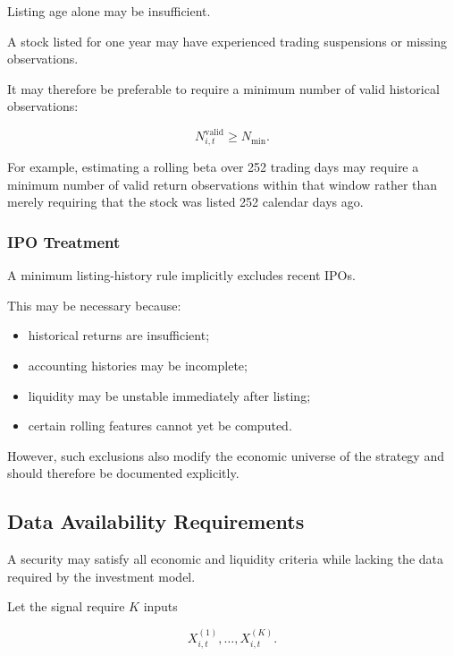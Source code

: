 \documentclass[11pt,a4paper]{article}
\begin{document}
Listing age alone may be insufficient.

A stock listed for one year may have experienced trading suspensions or missing
observations.

It may therefore be preferable to require a minimum number of valid historical
observations:

\begin{equation}
\boxed{
N_{i,t}^{\mathrm{valid}}
\geq
N_{\min}.
}
\end{equation}

For example, estimating a rolling beta over 252 trading days may require a
minimum number of valid return observations within that window rather than
merely requiring that the stock was listed 252 calendar days ago.


\subsubsection{IPO Treatment}

A minimum listing-history rule implicitly excludes recent IPOs.

This may be necessary because:

\begin{itemize}
    \item historical returns are insufficient;
    \item accounting histories may be incomplete;
    \item liquidity may be unstable immediately after listing;
    \item certain rolling features cannot yet be computed.
\end{itemize}

However, such exclusions also modify the economic universe of the strategy and
should therefore be documented explicitly.


\subsection{Data Availability Requirements}
\label{subsec:data_availability_requirements}

A security may satisfy all economic and liquidity criteria while lacking the
data required by the investment model.

Let the signal require $K$ inputs

\begin{equation}
X_{i,t}^{(1)},
\ldots,
X_{i,t}^{(K)}.
\end{equation}
\end{document}
